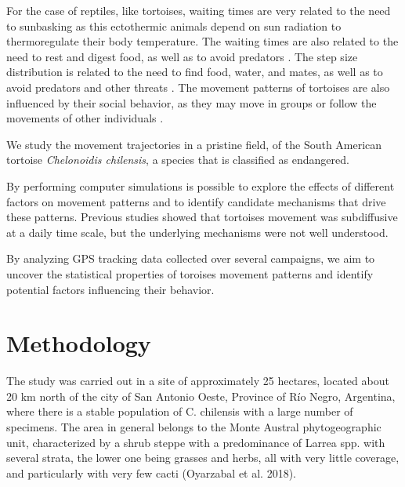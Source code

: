 \documentclass[a4paper]{article}
\begin{document}
For the case of reptiles, like tortoises, waiting times are very related to the need to sunbasking as this ectothermic animals depend on sun radiation to thermoregulate their body temperature. The waiting times are also related to the need to rest and digest food, as well as to avoid predators \cite{}. The step size distribution is related to the need to find food, water, and mates, as well as to avoid predators and other threats \cite{}. The movement patterns of tortoises are also influenced by their social behavior, as they may move in groups or follow the movements of other individuals \cite{hjelt2024}.

We study the movement trajectories in a pristine field, of the South American tortoise \textit{Chelonoidis chilensis}, a species that is classified as endangered. 

By performing computer simulations is possible to explore the effects of different factors on movement patterns and to identify candidate mechanisms that drive these patterns. 
Previous studies showed that tortoises movement was subdiffusive \cite{kazimierski2021} at a daily time scale, but the underlying mechanisms were not well understood.

By analyzing GPS tracking data collected over several campaigns, we aim to uncover the statistical properties of toroises movement patterns and identify potential factors influencing their behavior. 

\section*{Methodology}
The study was carried out in a site of approximately 25 hectares, located about 20 km north of the city of San Antonio Oeste, Province of Río Negro, Argentina, where there is a stable population of C. chilensis with a large number of specimens. The area in general belongs to the  Monte Austral phytogeographic unit, characterized by a shrub steppe with a predominance of  Larrea spp. with several strata, the lower one being grasses and herbs, all with very little coverage, and particularly with very few cacti (Oyarzabal et al. 2018).
\end{document}
